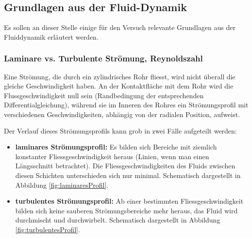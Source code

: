 \clearpage
\subsection{Grundlagen aus der Fluid-Dynamik}
\label{subsec:fluiddynamik}

Es sollen an dieser Stelle einige f\"ur den Versuch relevante Grundlagen aus
der Fluiddynamik erl\"autert werden.


\subsubsection{Laminare vs. Turbulente Str\"omung, Reynoldszahl}
\label{subsubsec:laminarVsTurb}

Eine  Str\"omung,  die  durch  ein  zylindrisches  Rohr  fliesst,  wird  nicht
\"uberall  die  gleiche  Geschwindigkeit  haben. An  der  Kontaktfl\"ache  mit
dem  Rohr   wird  die   Flussgeschwindigkeit  null  sein   (Randbedingung  der
entsprechenden Differentialgleichung), w\"ahrend sie im Inneren des Rohres ein
Str\"omungsprofil  mit  verschiedenen  Geschwindigkeiten, abh\"angig  von  der
radialen Position, aufweist.

Der Verlauf  dieses Str\"omungsprofils  kann grob  in zwei  F\"alle aufgeteilt
werden:

\begin{itemize}
    \item
        \textbf{laminares  Str\"omungsprofil:} Es  bilden  sich  Bereiche  mit
        ziemlich   konstanter  Fliessgeschwindigkeit   heraus  (Linien,   wenn
        man  einen   L\"angsschnitt  betrachtet). Die  Fliessgeschwindigkeiten
        des     Fluids     zwischen     diesen     Schichten     unterschieden
        sich    nur    minimal. Schematisch     dargestellt    in    Abbildung
        \ref{fig:laminaresProfil}.
    \item
        \textbf{turbulentes     Str\"omungsprofil:} Ab    einer     bestimmten
        Fliessgeschwindigkeit bilden  sich keine  sauberen Str\"omungsbereiche
        mehr heraus, das Fluid  wird durchmischt und durchwirbelt. Schematisch
        dargestellt in Abbildung \ref{fig:turbulentesProfil}.
\end{itemize}

